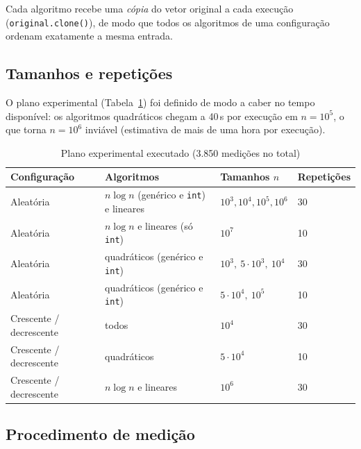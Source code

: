 \documentclass[11pt,a4paper]{article}
\begin{document}
Cada algoritmo recebe uma \emph{cópia} do vetor original a cada execução
(\texttt{original.clone()}), de modo que todos os algoritmos de uma configuração ordenam
exatamente a mesma entrada.

\subsection{Tamanhos e repetições}

O plano experimental (Tabela~\ref{tab:plano}) foi definido de modo a caber no tempo disponível:
os algoritmos quadráticos chegam a 40\,s por execução em $n=10^5$, o que torna $n=10^6$ inviável
(estimativa de mais de uma hora por execução).

\begin{table}[htbp]\centering\small
\caption{Plano experimental executado (3.850 medições no total)}\label{tab:plano}
\begin{tabular}{llll}
\toprule
Configuração & Algoritmos & Tamanhos $n$ & Repetições \\
\midrule
Aleatória & $n\log n$ (genérico e \texttt{int}) e lineares & $10^3, 10^4, 10^5, 10^6$ & 30 \\
Aleatória & $n\log n$ e lineares (só \texttt{int}) & $10^7$ & 10 \\
Aleatória & quadráticos (genérico e \texttt{int}) & $10^3,\ 5\cdot10^3,\ 10^4$ & 30 \\
Aleatória & quadráticos (genérico e \texttt{int}) & $5\cdot10^4,\ 10^5$ & 10 \\
Crescente / decrescente & todos & $10^4$ & 30 \\
Crescente / decrescente & quadráticos & $5\cdot10^4$ & 10 \\
Crescente / decrescente & $n\log n$ e lineares & $10^6$ & 30 \\
\bottomrule
\end{tabular}
\end{table}

\subsection{Procedimento de medição}
\end{document}

